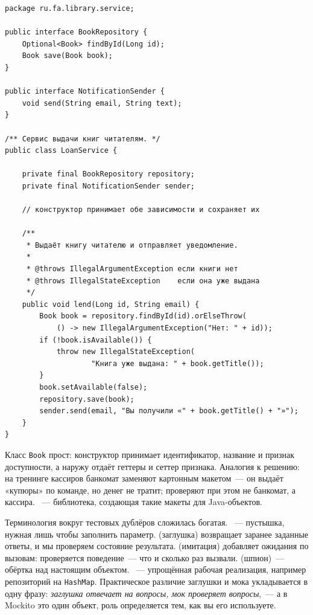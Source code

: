 \begin{listing}[H]
\begin{verbatim}
package ru.fa.library.service;

public interface BookRepository {
    Optional<Book> findById(Long id);
    Book save(Book book);
}

public interface NotificationSender {
    void send(String email, String text);
}

/** Сервис выдачи книг читателям. */
public class LoanService {

    private final BookRepository repository;
    private final NotificationSender sender;

    // конструктор принимает обе зависимости и сохраняет их

    /**
     * Выдаёт книгу читателю и отправляет уведомление.
     *
     * @throws IllegalArgumentException если книги нет
     * @throws IllegalStateException    если она уже выдана
     */
    public void lend(Long id, String email) {
        Book book = repository.findById(id).orElseThrow(
            () -> new IllegalArgumentException("Нет: " + id));
        if (!book.isAvailable()) {
            throw new IllegalStateException(
                    "Книга уже выдана: " + book.getTitle());
        }
        book.setAvailable(false);
        repository.save(book);
        sender.send(email, "Вы получили «" + book.getTitle() + "»");
    }
}
\end{verbatim}
\caption{Сервис с двумя зависимостями}
\label{lst:10-12}
\end{listing}

Класс \texttt{Book} прост: конструктор принимает идентификатор, название и признак доступности, а наружу отдаёт геттеры и сеттер признака. Аналогия к решению: на тренинге кассиров банкомат заменяют картонным макетом~--- он выдаёт «купюры» по команде, но денег не тратит; проверяют при этом не банкомат, а кассира. ~--- библиотека, создающая такие макеты для Java-объектов.

Терминология вокруг тестовых дублёров сложилась богатая. ~--- пустышка, нужная лишь чтобы заполнить параметр.  (заглушка) возвращает заранее заданные ответы, и мы проверяем состояние результата.  (имитация) добавляет ожидания по вызовам: проверяется поведение~--- что и сколько раз вызвали.  (шпион)~--- обёртка над настоящим объектом. ~--- упрощённая рабочая реализация, например репозиторий на \texttt{HashMap}. Практическое различие заглушки и мока укладывается в одну фразу: \emph{заглушка отвечает на вопросы, мок проверяет вопросы},~--- а в Mockito это один объект, роль определяется тем, как вы его используете.

